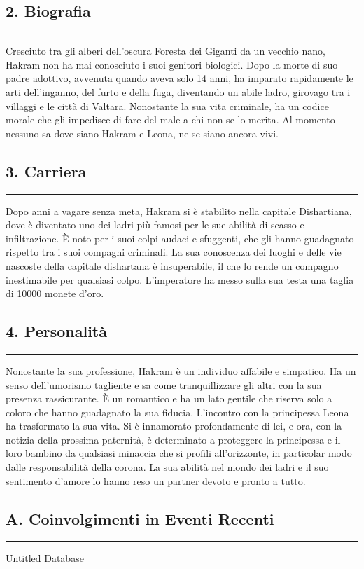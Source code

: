 \subsection{2. Biografia}\label{biografia}

\begin{center}\rule{0.5\linewidth}{0.5pt}\end{center}

Cresciuto tra gli alberi dell'oscura Foresta dei Giganti da un vecchio
nano, Hakram non ha mai conosciuto i suoi genitori biologici. Dopo la
morte di suo padre adottivo, avvenuta quando aveva solo 14 anni, ha
imparato rapidamente le arti dell'inganno, del furto e della fuga,
diventando un abile ladro, girovago tra i villaggi e le città di
Valtara. Nonostante la sua vita criminale, ha un codice morale che gli
impedisce di fare del male a chi non se lo merita. Al momento nessuno sa
dove siano Hakram e Leona, ne se siano ancora vivi.

\subsection{3. Carriera}\label{carriera}

\begin{center}\rule{0.5\linewidth}{0.5pt}\end{center}

Dopo anni a vagare senza meta, Hakram si è stabilito nella capitale
Dishartiana, dove è diventato uno dei ladri più famosi per le sue
abilità di scasso e infiltrazione. È noto per i suoi colpi audaci e
sfuggenti, che gli hanno guadagnato rispetto tra i suoi compagni
criminali. La sua conoscenza dei luoghi e delle vie nascoste della
capitale dishartana è insuperabile, il che lo rende un compagno
inestimabile per qualsiasi colpo. L'imperatore ha messo sulla sua testa
una taglia di 10000 monete d'oro.

\subsection{4. Personalità}\label{personalituxe0}

\begin{center}\rule{0.5\linewidth}{0.5pt}\end{center}

Nonostante la sua professione, Hakram è un individuo affabile e
simpatico. Ha un senso dell'umorismo tagliente e sa come tranquillizzare
gli altri con la sua presenza rassicurante. È un romantico e ha un lato
gentile che riserva solo a coloro che hanno guadagnato la sua fiducia.
L'incontro con la principessa Leona ha trasformato la sua vita. Si è
innamorato profondamente di lei, e ora, con la notizia della prossima
paternità, è determinato a proteggere la principessa e il loro bambino
da qualsiasi minaccia che si profili all'orizzonte, in particolar modo
dalle responsabilità della corona. La sua abilità nel mondo dei ladri e
il suo sentimento d'amore lo hanno reso un partner devoto e pronto a
tutto.

\subsection{A. Coinvolgimenti in Eventi
Recenti}\label{a.-coinvolgimenti-in-eventi-recenti}

\begin{center}\rule{0.5\linewidth}{0.5pt}\end{center}

\href{Untitled\%20Database\%2049897c1ada034aeebc6c1efae06d3b26.csv}{Untitled
Database}

